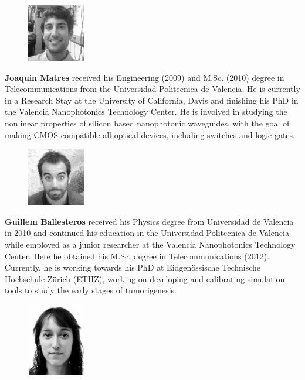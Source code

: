\documentclass[journal]{IEEEtran}
\newcommand{\extraSpace}{\vspace{30pt}}
\begin{document}
\extraSpace



\begin{figure}
\includegraphics[width=1in]{joaquin}
\end{figure}

\textbf{Joaquin Matres} received his Engineering (2009) and M.Sc. (2010) degree in Telecommunications from the Universidad Politecnica de Valencia. He is currently in a Research Stay at the University of California, Davis and finishing his PhD in the Valencia Nanophotonics Technology Center. He is involved in studying the nonlinear properties of silicon based nanophotonic waveguides, with the goal of making CMOS-compatible all-optical devices, including switches and logic gates.
\extraSpace

\begin{figure}
\includegraphics[width=1in]{guillem}
\end{figure}

\textbf{Guillem Ballesteros} received his Physics degree from Universidad de Valencia in 2010 and continued his education in the Universidad Politecnica de Valencia while employed as a junior researcher at the Valencia Nanophotonics Technology Center. Here he obtained his M.Sc. degree in Telecommunications (2012). Currently, he is working towards his PhD at Eidgen\"{o}ssische Technische Hochschule Z\"{u}rich (ETHZ), working on developing and calibrating simulation tools to study the early stages of tumorigenesis.
\extraSpace

\begin{figure}
\includegraphics[width=1in]{sara}
\end{figure}
\end{document}
